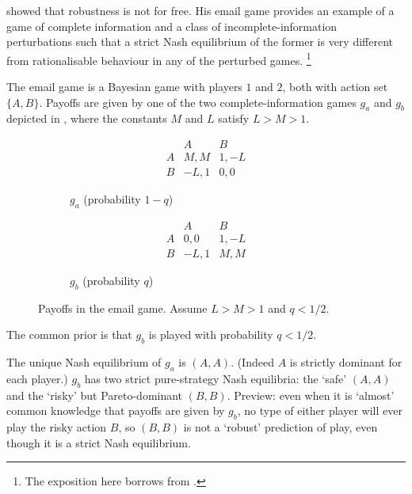 \documentclass[11pt,letterpaper,reqno,oneside]{article}
\begin{document}
\textcite{Rubinstein1989} showed that robustness is not for free. His email game provides an example of a game of complete information and a class of incomplete-information perturbations such that a strict Nash equilibrium of the former is very different from rationalisable behaviour in any of the perturbed games.%
	\footnote{The exposition here borrows from \textcite[][sec. 5.5]{OsborneRubinstein1994}.}

The email game is a Bayesian game with players $1$ and $2$, both with action set $\{A,B\}$. Payoffs are given by one of the two complete-information games $g_a$ and $g_b$ depicted in , where the constants $M$ and $L$ satisfy $L>M>1$.
%
\begin{figure}
	\begin{subfigure}{0.5\textwidth}
		\begin{equation*}
			\begin{array}{c|cc}
					& A		& B		\\ \hline
				A	& M,M	& 1,-L	\\
				B	& -L,1	& 0,0	
			\end{array}
		\end{equation*}
		\caption{$g_a$ (probability $1-q$)}
	\end{subfigure}
	\begin{subfigure}{0.5\textwidth}
		\begin{equation*}
			\begin{array}{c|cc}
					& A		& B		\\ \hline
				A	& 0,0	& 1,-L	\\
				B	& -L,1	& M,M	
			\end{array}
		\end{equation*}
		\caption{$g_b$ (probability $q$)}
	\end{subfigure}
	\caption{Payoffs in the email game. Assume $L>M>1$ and $q<1/2$.}
	\label{fig:email_game_payoffs}
\end{figure}
%
The common prior is that $g_b$ is played with probability $q<1/2$.

The unique Nash equilibrium of $g_a$ is $(A,A)$. (Indeed $A$ is strictly dominant for each player.) $g_b$ has two strict pure-strategy Nash equilibria: the `safe' $(A,A)$ and the `risky' but Pareto-dominant $(B,B)$. Preview: even when it is `almost' common knowledge that payoffs are given by $g_b$, no type of either player will ever play the risky action $B$, so $(B,B)$ is not a `robust' prediction of play, even though it is a strict Nash equilibrium.
\end{document}
